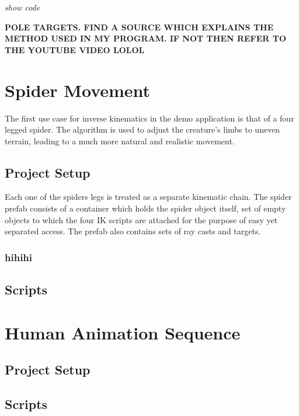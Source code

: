 \textit{show code}

\textbf{POLE TARGETS. FIND A SOURCE WHICH EXPLAINS THE METHOD USED IN MY
PROGRAM. IF NOT THEN REFER TO THE YOUTUBE VIDEO LOLOL}


\section{Spider Movement}
The first use case for inverse kinematics in the demo application is that of
a four legged spider. The algorithm is used to adjust the creature's limbs to
uneven terrain, leading to a much more natural and realistic movement.
\subsection{Project Setup}
Each one of the spiders legs is treated as a separate kinematic chain. The
spider prefab consists of a container which holds the spider object itself, set
of empty objects to which the four IK scripts are attached for the purpose of
easy yet separated access. The prefab also contains sets of ray casts and
targets.
\subsubsection{hihihi}


\subsection{Scripts}
\section{Human Animation Sequence}
\subsection{Project Setup}
\subsection{Scripts}
